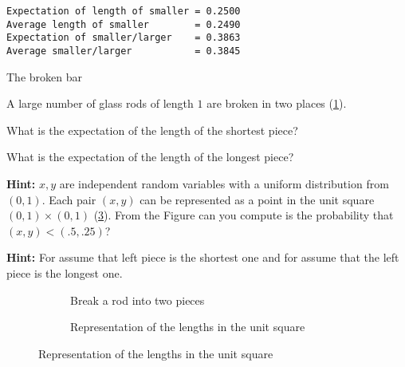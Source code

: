 \newpage

\sml{}
\begin{verbatim}
Expectation of length of smaller = 0.2500
Average length of smaller        = 0.2490
Expectation of smaller/larger    = 0.3863
Average smaller/larger           = 0.3845
\end{verbatim}



\begin{prob}{The broken bar}

A large number of glass rods of length $1$ are broken in two places (\ref{f.break1}).

 What is the expectation of the length of the shortest piece?

 What is the expectation of the length of the longest piece?

\textbf{Hint:} $x,y$ are independent random variables with a uniform distribution from $(0,1)$. Each pair $(x,y)$ can be represented as a point in the unit square $(0,1)\times (0,1)$ (\ref{f.break2}). From the Figure can you compute is the probability that $(x,y) < (.5,.25)$?

\textbf{Hint:} For  assume that left piece is the shortest one and for  assume that the left piece is the longest one.
\begin{figure}[tb]
\begin{center}
\begin{subfigure}{.4\textwidth}
\caption{Break a rod into two pieces\hspace{6em}\mbox{}}\label{f.break1}
\end{subfigure}
\hspace{3em}
\begin{subfigure}{.4\textwidth}
\caption{Representation of the lengths in the unit square}\label{f.break2}
\end{subfigure}
\end{center}
\end{figure}
\end{prob}

